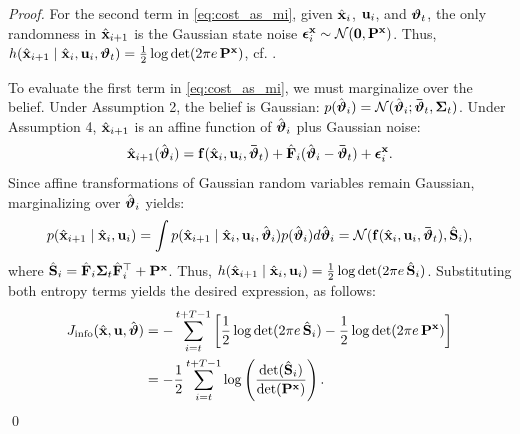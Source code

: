 \begin{proof}
For the second term in \eqref{eq:cost_as_mi}, given $\hat{\mathbf{x}}_i$, $\mathbf{u}_i$, and $\boldsymbol{{\vartheta}}_t$, the only randomness in $\hat{\mathbf{x}}_{i+1}$ is the Gaussian state noise $\boldsymbol{\epsilon}^{\mathbf{x}}_i \sim \mathcal{N}(\mathbf{0}, \mathbf{P}^{\mathbf{x}})$.
Thus, $h(\hat{\mathbf{x}}_{i+1} \mid \hat{\mathbf{x}}_i, \mathbf{u}_i, \boldsymbol{{\vartheta}}_t) = \frac{1}{2}\log\det(2\pi e \, \mathbf{P}^{\mathbf{x}})$, cf. \cite[Theorem~8.4.1]{cover1999elements}.

To evaluate the first term in \eqref{eq:cost_as_mi}, we must marginalize over the belief.
Under Assumption 2, the belief is Gaussian: $p(\hat{\boldsymbol{{\vartheta}}}_i) = \mathcal{N}(\hat{\boldsymbol{{\vartheta}}}_i;\boldsymbol{\bar{\boldsymbol{{\vartheta}}}}_t, \boldsymbol{\boldsymbol{\Sigma}}_t)$.
Under Assumption 4, $\hat{\mathbf{x}}_{i+1}$ is an affine function of $\hat{\boldsymbol{{\vartheta}}}_i$ plus Gaussian noise:
\begin{equation}
    \hat{\mathbf{x}}_{i+1}(\hat{\boldsymbol{{\vartheta}}}_{i}) = \mathbf{f}(\hat{\mathbf{x}}_i, \mathbf{u}_i, \boldsymbol{\bar{\boldsymbol{{\vartheta}}}}_t) + \hat{\mathbf{F}}_i (\hat{\boldsymbol{{\vartheta}}}_i - \boldsymbol{\bar{\boldsymbol{{\vartheta}}}}_t) + \boldsymbol{\epsilon}^{\mathbf{x}}_i.
\end{equation}
Since affine transformations of Gaussian random variables remain Gaussian, marginalizing over $\hat{\boldsymbol{{\vartheta}}}_i$ yields:
\begin{equation}
    p(\hat{\mathbf{x}}_{i+1} \mid \hat{\mathbf{x}}_i, \mathbf{u}_i) = \int p(\hat{\mathbf{x}}_{i+1} \mid \hat{\mathbf{x}}_i, \mathbf{u}_i, \hat{\boldsymbol{{\vartheta}}}_i) p(\hat{\boldsymbol{{\vartheta}}}_i) d\hat{\boldsymbol{{\vartheta}}}_i = \mathcal{N}(\mathbf{f}(\hat{\mathbf{x}}_i, \mathbf{u}_i, \boldsymbol{\bar{\boldsymbol{{\vartheta}}}}_t), \hat{\mathbf{S}}_i),
\end{equation}
where $\hat{\mathbf{S}}_i = \hat{\mathbf{F}}_i \boldsymbol{\boldsymbol{\Sigma}}_t \hat{\mathbf{F}}_i^\top + \mathbf{P}^{\mathbf{x}}$.
Thus, $h(\hat{\mathbf{x}}_{i+1} \mid \hat{\mathbf{x}}_i, \mathbf{u}_i) = \frac{1}{2}\log\det(2\pi e \, \hat{\mathbf{S}}_i)$.
Substituting both entropy terms yields the desired expression, as follows:
\begin{subequations}
    \begin{align}
        J_{\text{info}}(\hat{\mathbf{x}}, \mathbf{u}, \hat{\boldsymbol{{\vartheta}}}) &= -\sum_{i=t}^{t+T-1} \left[ \frac{1}{2}\log\det(2\pi e \, \hat{\mathbf{S}}_i) - \frac{1}{2}\log\det(2\pi e \, \mathbf{P}^{\mathbf{x}}) \right]\\
        &= -\frac{1}{2}\sum_{i=t}^{t+T-1} \log\left( \frac{\det(\hat{\mathbf{S}}_i)}{\det(\mathbf{P}^{\mathbf{x}})} \right).
    \end{align}
\end{subequations}
\qed
\end{proof}

